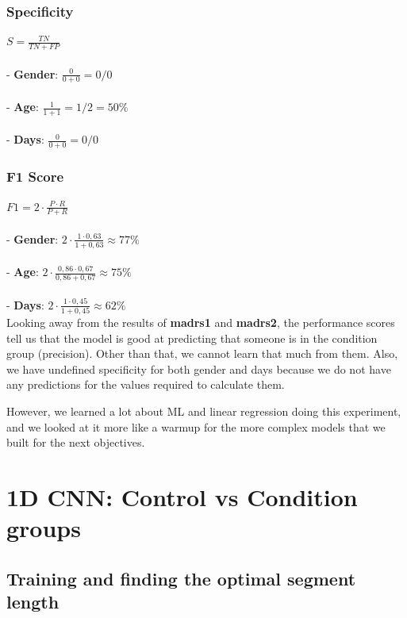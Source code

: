 \subsubsection{Specificity}
$ S = \frac{TN}{TN+FP} $
\\\\
- \textbf{Gender}: $\frac{0}{0+0} = 0/0$\\\\
- \textbf{Age}: $\frac{1}{1+1} = 1/2 = 50\%$\\\\
- \textbf{Days}: $\frac{0}{0+0} = 0/0$\\

\subsubsection{F1 Score}
$ F1 = 2 \cdot \frac{P \cdot R}{P + R} $
\\\\
- \textbf{Gender}: $2 \cdot \frac{1 \cdot 0,63}{1 + 0,63} \approx 77\%$\\\\
- \textbf{Age}: $2 \cdot \frac{0,86 \cdot 0,67}{0,86 + 0,67} \approx 75\%$\\\\
- \textbf{Days}: $2 \cdot \frac{1 \cdot 0,45}{1 + 0,45} \approx 62\%$\\

Looking away from the results of \textbf{madrs1} and \textbf{madrs2}, the performance scores tell us that the model is good at predicting that someone is in the condition group (precision). Other than that, we cannot learn that much from them. Also, we have undefined specificity for both gender and days because we do not have any predictions for the values required to calculate them. 

However, we learned a lot about ML and linear regression doing this experiment, and we looked at it more like a warmup for the more complex models that we built for the next objectives.

\section{1D CNN: Control vs Condition groups}

\subsection{Training and finding the optimal segment length}


